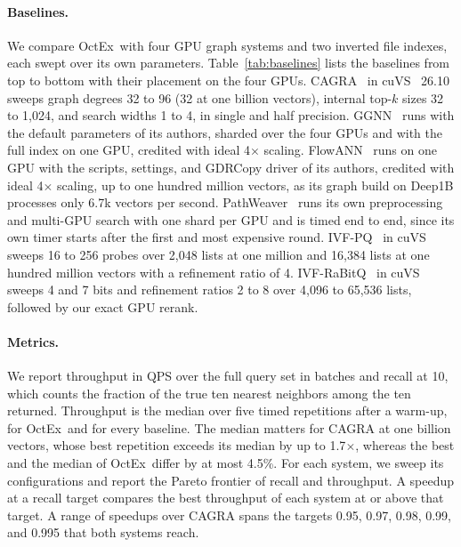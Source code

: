 \documentclass[letterpaper,twocolumn,10pt]{article}
\newcommand{\sysname}{OctEx}
\begin{document}
\paragraph{Baselines.} We compare \sysname\ with four GPU graph systems and two inverted file indexes, each swept over its own parameters. Table~\ref{tab:baselines} lists the baselines from top to bottom with their placement on the four GPUs. CAGRA~\cite{ootomo2024cagra} in cuVS~\cite{nvidia2025cuvs} 26.10 sweeps graph degrees 32 to 96 (32 at one billion vectors), internal top-$k$ sizes 32 to 1,024, and search widths 1 to 4, in single and half precision. GGNN~\cite{groh2023ggnn} runs with the default parameters of its authors, sharded over the four GPUs and with the full index on one GPU, credited with ideal 4$\times$ scaling. FlowANN~\cite{zhao2026flowann} runs on one GPU with the scripts, settings, and GDRCopy driver of its authors, credited with ideal 4$\times$ scaling, up to one hundred million vectors, as its graph build on Deep1B processes only 6.7k vectors per second. PathWeaver~\cite{kim2025pathweaver} runs its own preprocessing and multi-GPU search with one shard per GPU and is timed end to end, since its own timer starts after the first and most expensive round. IVF-PQ~\cite{jegou2011pq,nvidia2025cuvs} in cuVS sweeps 16 to 256 probes over 2,048 lists at one million and 16,384 lists at one hundred million vectors with a refinement ratio of 4. IVF-RaBitQ~\cite{shi2026ivfrabitq} in cuVS sweeps 4 and 7 bits and refinement ratios 2 to 8 over 4,096 to 65,536 lists, followed by our exact GPU rerank.

\paragraph{Metrics.} We report throughput in QPS over the full query set in batches and recall at 10, which counts the fraction of the true ten nearest neighbors among the ten returned. Throughput is the median over five timed repetitions after a warm-up, for \sysname\ and for every baseline. The median matters for CAGRA at one billion vectors, whose best repetition exceeds its median by up to 1.7$\times$, whereas the best and the median of \sysname\ differ by at most 4.5\%. For each system, we sweep its configurations and report the Pareto frontier of recall and throughput. A speedup at a recall target compares the best throughput of each system at or above that target. A range of speedups over CAGRA spans the targets 0.95, 0.97, 0.98, 0.99, and 0.995 that both systems reach.
\end{document}
